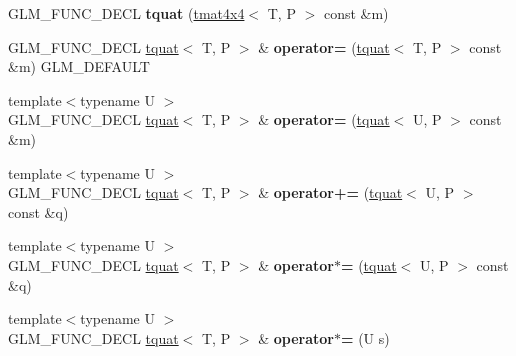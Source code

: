 \begin{DoxyCompactItemize}
\item 
\hypertarget{structglm_1_1tquat_a738e6d5bcc5a75cca8ac119edafaeafa}{G\-L\-M\-\_\-\-F\-U\-N\-C\-\_\-\-D\-E\-C\-L {\bfseries tquat} (\hyperlink{structglm_1_1tmat4x4}{tmat4x4}$<$ T, P $>$ const \&m)}\label{structglm_1_1tquat_a738e6d5bcc5a75cca8ac119edafaeafa}

\item 
\hypertarget{structglm_1_1tquat_a19b252f704a5d0cb43df15cd3a8b545e}{G\-L\-M\-\_\-\-F\-U\-N\-C\-\_\-\-D\-E\-C\-L \hyperlink{structglm_1_1tquat}{tquat}$<$ T, P $>$ \& {\bfseries operator=} (\hyperlink{structglm_1_1tquat}{tquat}$<$ T, P $>$ const \&m) G\-L\-M\-\_\-\-D\-E\-F\-A\-U\-L\-T}\label{structglm_1_1tquat_a19b252f704a5d0cb43df15cd3a8b545e}

\item 
\hypertarget{structglm_1_1tquat_af00985afe704157487281c4c3eb4f790}{{\footnotesize template$<$typename U $>$ }\\G\-L\-M\-\_\-\-F\-U\-N\-C\-\_\-\-D\-E\-C\-L \hyperlink{structglm_1_1tquat}{tquat}$<$ T, P $>$ \& {\bfseries operator=} (\hyperlink{structglm_1_1tquat}{tquat}$<$ U, P $>$ const \&m)}\label{structglm_1_1tquat_af00985afe704157487281c4c3eb4f790}

\item 
\hypertarget{structglm_1_1tquat_a6a659798636ad7f9d8cb392904b61020}{{\footnotesize template$<$typename U $>$ }\\G\-L\-M\-\_\-\-F\-U\-N\-C\-\_\-\-D\-E\-C\-L \hyperlink{structglm_1_1tquat}{tquat}$<$ T, P $>$ \& {\bfseries operator+=} (\hyperlink{structglm_1_1tquat}{tquat}$<$ U, P $>$ const \&q)}\label{structglm_1_1tquat_a6a659798636ad7f9d8cb392904b61020}

\item 
\hypertarget{structglm_1_1tquat_a3aaba279045f689985499e21aafd1ab8}{{\footnotesize template$<$typename U $>$ }\\G\-L\-M\-\_\-\-F\-U\-N\-C\-\_\-\-D\-E\-C\-L \hyperlink{structglm_1_1tquat}{tquat}$<$ T, P $>$ \& {\bfseries operator$\ast$=} (\hyperlink{structglm_1_1tquat}{tquat}$<$ U, P $>$ const \&q)}\label{structglm_1_1tquat_a3aaba279045f689985499e21aafd1ab8}

\item 
\hypertarget{structglm_1_1tquat_ac92bf2dc48e2c7e3f4976b25a5daf78a}{{\footnotesize template$<$typename U $>$ }\\G\-L\-M\-\_\-\-F\-U\-N\-C\-\_\-\-D\-E\-C\-L \hyperlink{structglm_1_1tquat}{tquat}$<$ T, P $>$ \& {\bfseries operator$\ast$=} (U s)}\label{structglm_1_1tquat_ac92bf2dc48e2c7e3f4976b25a5daf78a}


\end{DoxyCompactItemize}
